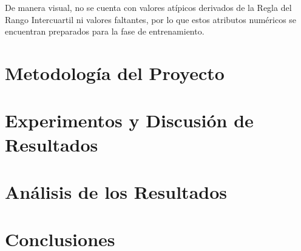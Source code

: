 \documentclass[12pt,a4paper]{article}
\begin{document}
{{            De manera visual, no se cuenta con valores atípicos derivados de la Regla del 
            Rango Intercuartil ni valores faltantes, por lo que estos atributos numéricos se 
            encuentran preparados para la fase de entrenamiento.
        }

    }
    \newpage

    \section{Metodología del Proyecto}
    {}
    \newpage

    \section{Experimentos y Discusión de Resultados}
    {}
    \newpage

    \section{Análisis de los Resultados}
    {}
    \newpage

    \section{Conclusiones}
    {}
    \newpage

    \printbibliography[heading=bibintoc,title={Referencias Bibliográficas}]
\end{document}
